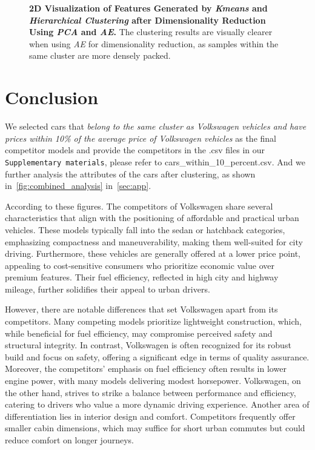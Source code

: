 \documentclass{article} %
\newcommand{\greentext}[1]{\textcolor{green!50!black}{#1}}
\newcommand{\bluetext}[1]{\textcolor{blue!50!black}{#1}}
\begin{document}
\begin{figure}[!t]
    \caption{\textbf{2D Visualization of Features Generated by \textit{Kmeans} and \textit{Hierarchical Clustering} after Dimensionality Reduction Using \textit{PCA} and \textit{AE}.} The clustering results are visually clearer when using \textit{AE} for dimensionality reduction, as samples within the same cluster are more densely packed.}
    \label{fig:visual}
    \vspace{-12pt}
 \end{figure}
 
 


\section{Conclusion}
\label{sec:conclusion}

We selected cars that \bluetext{\textit{belong to the same cluster as Volkswagen vehicles and have prices within 10\% of the average price of Volkswagen vehicles}} as the final competitor models
and provide the competitors in the .csv files in our \texttt{Supplementary materials}, please refer to \greentext{cars\_within\_10\_percent.csv}.
And we further analysis the attributes of the cars after clustering, as shown in~\autoref{fig:combined_analysis} in~\autoref{sec:app}.

According to these figures. The competitors of Volkswagen share several characteristics that align with the positioning of affordable and practical urban vehicles. These models typically fall into the sedan or hatchback categories, emphasizing compactness and maneuverability, making them well-suited for city driving.
Furthermore, these vehicles are generally offered at a lower price point, appealing to cost-sensitive consumers who prioritize economic value over premium features. Their fuel efficiency, reflected in high city and highway mileage, further solidifies their appeal to urban drivers.

However, there are notable differences that set Volkswagen apart from its competitors. Many competing models prioritize lightweight construction, which, while beneficial for fuel efficiency, may compromise perceived safety and structural integrity. In contrast, Volkswagen is often recognized for its robust build and focus on safety, offering a significant edge in terms of quality assurance. 
Moreover, the competitors’ emphasis on fuel efficiency often results in lower engine power, with many models delivering modest horsepower. Volkswagen, on the other hand, strives to strike a balance between performance and efficiency, catering to drivers who value a more dynamic driving experience.
Another area of differentiation lies in interior design and comfort. Competitors frequently offer smaller cabin dimensions, which may suffice for short urban commutes but could reduce comfort on longer journeys. 
\end{document}
